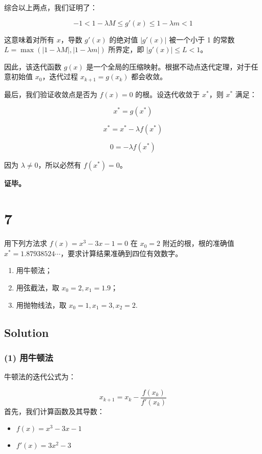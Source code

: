 \documentclass[11pt]{article}
\providecommand{\tightlist}{%
      \setlength{\itemsep}{0pt}\setlength{\parskip}{0pt}}
\begin{document}
综合以上两点，我们证明了：

\[ -1 < 1 - \lambda M \le g'(x) \le 1 - \lambda m < 1 \]

这意味着对所有 \(x\)，导数 \(g'(x)\) 的绝对值 \(|g'(x)|\) 被一个小于 1
的常数 \(L = \max(|1-\lambda M|, |1-\lambda m|)\) 所界定，即
\(|g'(x)| \le L < 1\)。

因此，该迭代函数 \(g(x)\)
是一个全局的压缩映射。根据不动点迭代定理，对于任意初始值
\(x_0\)，迭代过程 \(x_{k+1} = g(x_k)\) 都会收敛。

最后，我们验证收敛点是否为 \(f(x)=0\) 的根。设迭代收敛于 \(x^*\)，则
\(x^*\) 满足：

\[ x^* = g(x^*) \]

\[ x^* = x^* - \lambda f(x^*) \]

\[ 0 = -\lambda f(x^*) \]

因为 \(\lambda \neq 0\)，所以必然有 \(f(x^*) = 0\)。

\textbf{证毕。}

    \section{7}\label{section}

用下列方法求 \(f(x) = x^3 - 3x - 1 = 0\) 在 \(x_0 = 2\)
附近的根，根的准确值
\(x^* = 1.87938524\cdots\)，要求计算结果准确到四位有效数字。

\begin{enumerate}
\def\labelenumi{(\arabic{enumi})}
\item
  用牛顿法；
\item
  用弦截法，取 \(x_0 = 2, x_1 = 1.9\)；
\item
  用抛物线法，取 \(x_0 = 1, x_1 = 3, x_2 = 2\).
\end{enumerate}

\subsection{Solution}\label{solution}

\subsubsection{(1) 用牛顿法}\label{ux7528ux725bux987fux6cd5}

牛顿法的迭代公式为：

\[ x_{k+1} = x_k - \frac{f(x_k)}{f'(x_k)} \]
首先，我们计算函数及其导数：

\begin{itemize}
\tightlist
\item
  \(f(x) = x^3 - 3x - 1\)
\item
  \(f'(x) = 3x^2 - 3\)
\end{itemize}
\end{document}
